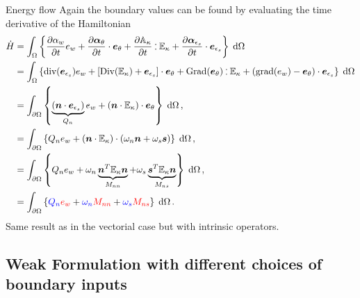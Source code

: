 \documentclass{beamer}
\def\onedot{$\mathsurround0pt\ldotp$}
\def\cddot{%
	\mathbin{\vcenter{\baselineskip.67ex
			\hbox{\onedot}\hbox{\onedot}}%
}}
\newcommand{\blue}[1]{\textcolor{blue}{#1}}
\newcommand{\red}[1]{\textcolor{red}{#1}}
\begin{document}
\begin{frame}{Energy flow}
	Again the boundary values can be found by evaluating the time derivative of the Hamiltonian
	\footnotesize{
	\begin{equation*}
	\begin{aligned}
	\dot{H}&= \int_{\Omega} \left\{ \diffp{\alpha_w}{t} e_w  + \diffp{\bm\alpha_\theta}{t} \cdot \bm{e}_\theta + \diffp{\mathbb{A}_{\kappa}}{t} \cddot \mathbb{E}_{\kappa}  + \diffp{\bm\alpha_{\epsilon_s}}{t} \cdot \bm{e}_{\epsilon_s} \right\} \d\Omega \\
	&= \int_{\Omega} \left\{ \mathrm{div}(\bm{e}_{\epsilon_s}) e_w  + \left[\mathrm{Div}(\mathbb{E}_{\kappa}) + \bm{e}_{\epsilon_s} \right] \cdot \bm{e}_\theta + \mathrm{Grad}(\bm{e}_{\theta}) \cddot \mathbb{E}_{\kappa}  + (\mathrm{grad} (e_w) - \bm{e}_{\theta}) \cdot \bm{e}_{\epsilon_s} \right\} \d\Omega \\
	&= \int_{\partial \Omega} \left\{ \underbrace{(\bm{n} \cdot \bm{e}_{\epsilon_s})}_{Q_n} e_w  + (\bm{n} \cdot \mathbb{E}_{\kappa}) \cdot \bm{e}_\theta \right\} \d\Omega\,, \\
	&= \int_{\partial \Omega} \left\{ Q_n e_w  + (\bm{n} \cdot \mathbb{E}_{\kappa}) \cdot (\omega_n \bm{n} + \omega_s \bm{s}) \right\} \d\Omega\,, \\&= \int_{\partial \Omega} \left\{ Q_n e_w  + \omega_n  \underbrace{\bm{n}^T \mathbb{E}_{\kappa} \bm{n}}_{M_{nn}} + \omega_s \underbrace{\bm{s}^T \mathbb{E}_{\kappa} \bm{n}}_{M_{ns}} \right\} \d\Omega\,, \\
	&= \int_{\partial \Omega} \left\{ \blue{Q_n} \red{e_w}  + \blue{\omega_n} \red{M_{nn}} + \blue{\omega_s} \red{M_{ns}} \right\} \d\Omega\,.  \\
	\end{aligned}
	\end{equation*}
	}
\normalsize
Same result as in the vectorial case but with intrinsic operators.
\end{frame}

\subsection{Weak Formulation with different choices of boundary inputs}
\end{document}

